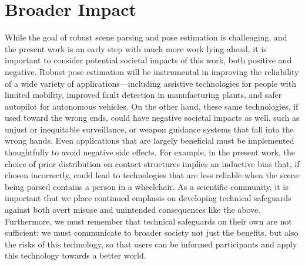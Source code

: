 \section{Broader Impact}

While the goal of robust scene parsing and pose estimation is challenging, and
the present work is an early step with much more work lying ahead, it is
important to consider potential societal impacts of this work, both positive
and negative.  Robust pose estimation will be instrumental in improving the
reliability of a wide variety of applications---including assistive
technologies for people with limited mobility, improved fault detection in
manufacturing plants, and safer autopilot for autonomous vehicles.  On the
other hand, these same technologies, if used toward the wrong ends, could have
negative societal impacts as well, such as unjust or inequitable surveillance,
or weapon guidance systems that fall into the wrong hands.  Even applications
that are largely beneficial must be implemented thoughtfully to avoid negative
side effects.  For example, in the present work, the choice of prior
distribution on contact structures implies an inductive bias that, if chosen
incorrectly, could lead to technologies that are less reliable when the scene
being parsed contains a person in a wheelchair.  As a scientific community, it
is important that we place continued emphasis on developing technical
safeguards against both overt misuse and unintended consequences like the
above.  Furthermore, we must remember that technical safeguards on their own
are not sufficient: we must communicate to broader society not just the
benefits, but also the risks of this technology, so that users can be informed
participants and apply this technology towards a better world.

